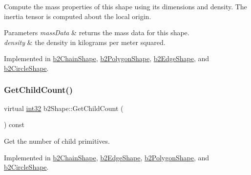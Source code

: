 Compute the mass properties of this shape using its dimensions and density. The inertia tensor is computed about the local origin. 
\begin{DoxyParams}{Parameters}
{\em mass\+Data} & returns the mass data for this shape. \\
\hline
{\em density} & the density in kilograms per meter squared. \\
\hline
\end{DoxyParams}


Implemented in \mbox{\hyperlink{classb2_chain_shape_aad3671d6eab61f6b26e2f1b6ac50bb98}{b2\+Chain\+Shape}}, \mbox{\hyperlink{classb2_polygon_shape_a908db2a51fc79fd49d6fe06be2cd8474}{b2\+Polygon\+Shape}}, \mbox{\hyperlink{classb2_edge_shape_ac738c1e0ab2f4dfbab26e3942efa60af}{b2\+Edge\+Shape}}, and \mbox{\hyperlink{classb2_circle_shape_a7dc07891abd015863fbf03076e47eec5}{b2\+Circle\+Shape}}.

\mbox{\label{classb2_shape_a05a3c445017d96df9238ceefe6ce37ab}} 
\subsubsection{\texorpdfstring{GetChildCount()}{GetChildCount()}}
{\footnotesize\ttfamily virtual \mbox{\hyperlink{b2_settings_8h_a43d43196463bde49cb067f5c20ab8481}{int32}} b2\+Shape\+::\+Get\+Child\+Count (\begin{DoxyParamCaption}{ }\end{DoxyParamCaption}) const\hspace{0.3cm}{\ttfamily [pure virtual]}}



Get the number of child primitives. 



Implemented in \mbox{\hyperlink{classb2_chain_shape_a4d4fd8f5386a30f35b10d1b2848dbe54}{b2\+Chain\+Shape}}, \mbox{\hyperlink{classb2_edge_shape_ae9dcaa2f4b77fcf182d29159658da82a}{b2\+Edge\+Shape}}, \mbox{\hyperlink{classb2_polygon_shape_aa8bb0d5a88624104425cdee0b2f4427a}{b2\+Polygon\+Shape}}, and \mbox{\hyperlink{classb2_circle_shape_a552db3402aed5d12c3177981e5208065}{b2\+Circle\+Shape}}.

\mbox{\label{classb2_shape_a600cceee6186d81bb1b8ab142324bba6}} 
